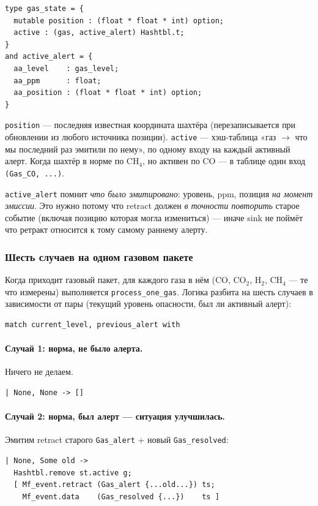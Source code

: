 \begin{lstlisting}
type gas_state = {
  mutable position : (float * float * int) option;
  active : (gas, active_alert) Hashtbl.t;
}
and active_alert = {
  aa_level    : gas_level;
  aa_ppm      : float;
  aa_position : (float * float * int) option;
}
\end{lstlisting}

\texttt{position} --- последняя известная координата шахтёра
(перезаписывается при обновлении из любого источника позиции).
\texttt{active} --- хэш-таблица «газ $\to$ что мы последний раз
эмитили по нему», по одному входу на каждый активный алерт. Когда
шахтёр в норме по CH$_4$, но активен по CO --- в таблице один
вход \texttt{(Gas\_CO, ...)}.

\texttt{active\_alert} помнит \emph{что было эмитировано}: уровень,
ppm, позиция \emph{на момент эмиссии}. Это нужно потому что
retract должен \emph{в точности повторить} старое событие
(включая позицию которая могла измениться) --- иначе sink не
поймёт что ретракт относится к тому самому раннему алерту.

\subsubsection{Шесть случаев на одном газовом пакете}

Когда приходит газовый пакет, для каждого газа в нём (CO, CO$_2$,
H$_2$, CH$_4$ --- те что измерены) выполняется
\texttt{process\_one\_gas}. Логика разбита на шесть случаев в
зависимости от пары (текущий уровень опасности, был ли активный
алерт):

\begin{lstlisting}
match current_level, previous_alert with
\end{lstlisting}

\paragraph{Случай 1: норма, не было алерта.} Ничего не делаем.
\begin{lstlisting}
| None, None -> []
\end{lstlisting}

\paragraph{Случай 2: норма, был алерт --- ситуация улучшилась.}
Эмитим retract старого \texttt{Gas\_alert} + новый
\texttt{Gas\_resolved}:
\begin{lstlisting}
| None, Some old ->
  Hashtbl.remove st.active g;
  [ Mf_event.retract (Gas_alert {...old...}) ts;
    Mf_event.data    (Gas_resolved {...})    ts ]
\end{lstlisting}

